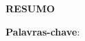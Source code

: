 \begin{center}
    \textbf{RESUMO}
\end{center}

\lipsum[1-2]

\noindent \textbf{Palavras-chave}: \palavraschave